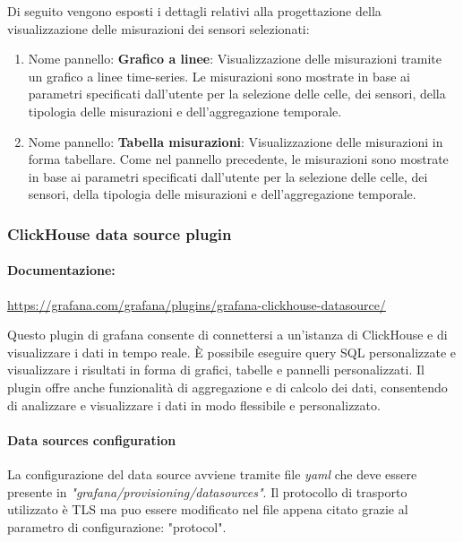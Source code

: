 Di seguito vengono esposti i dettagli relativi alla progettazione della visualizzazione delle misurazioni dei sensori selezionati:
\begin{enumerate}
    \item Nome pannello: \textbf{Grafico a linee}: 
    Visualizzazione delle misurazioni tramite un grafico a linee time-series. Le misurazioni sono mostrate in base ai parametri specificati dall'utente per la selezione delle celle, dei sensori, della tipologia delle misurazioni e dell'aggregazione temporale.
    \item Nome pannello: \textbf{Tabella misurazioni}: 
    Visualizzazione delle misurazioni in forma tabellare. Come nel pannello precedente, le misurazioni sono mostrate in base ai parametri specificati dall'utente per la selezione delle celle, dei sensori, della tipologia delle misurazioni e dell'aggregazione temporale.
\end{enumerate}

\subsubsection{ClickHouse data source plugin} \label{sec:click_plugin}
\paragraph{Documentazione:}
\href{https://grafana.com/grafana/plugins/grafana-clickhouse-datasource/}{https://grafana.com/grafana/plugins/grafana-clickhouse-datasource/}

Questo plugin di grafana consente di connettersi a un'istanza di ClickHouse e di visualizzare i dati in tempo reale. È possibile eseguire query SQL personalizzate e visualizzare i risultati in forma di grafici, tabelle e pannelli personalizzati. Il plugin offre anche funzionalità di aggregazione e di calcolo dei dati, consentendo di analizzare e visualizzare i dati in modo flessibile e personalizzato.

\paragraph{Data sources configuration}
La configurazione del data source avviene tramite file \textit{yaml} che deve essere presente in \textit{"grafana/provisioning/datasources"}.
Il protocollo di trasporto utilizzato è TLS ma puo essere modificato nel file appena citato grazie al parametro di configurazione: "protocol".

